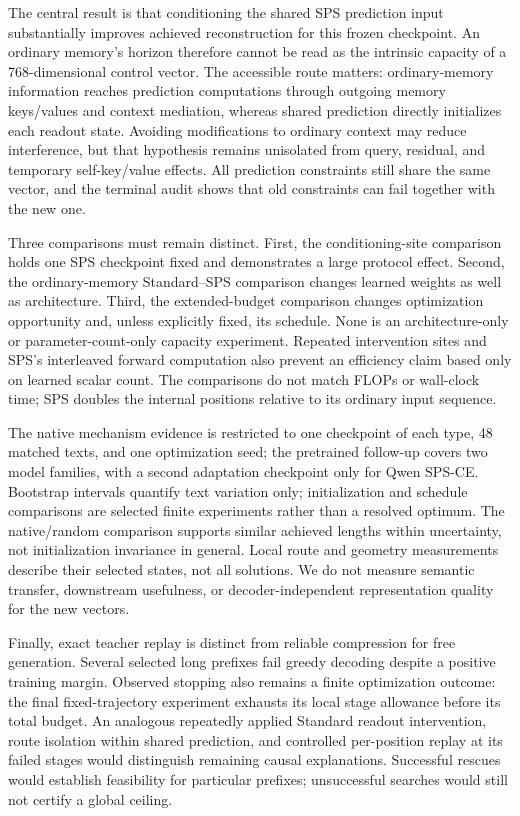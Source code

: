 \documentclass{article}
\begin{document}
The central result is that conditioning the shared SPS prediction input substantially improves achieved reconstruction for this frozen checkpoint.
An ordinary memory's horizon therefore cannot be read as the intrinsic capacity of a 768-dimensional control vector.
The accessible route matters: ordinary-memory information reaches prediction computations through outgoing memory keys/values and context mediation, whereas shared prediction directly initializes each readout state.
Avoiding modifications to ordinary context may reduce interference, but that hypothesis remains unisolated from query, residual, and temporary self-key/value effects.
All prediction constraints still share the same vector, and the terminal audit shows that old constraints can fail together with the new one.

Three comparisons must remain distinct.
First, the conditioning-site comparison holds one SPS checkpoint fixed and demonstrates a large protocol effect.
Second, the ordinary-memory Standard--SPS comparison changes learned weights as well as architecture.
Third, the extended-budget comparison changes optimization opportunity and, unless explicitly fixed, its schedule.
None is an architecture-only or parameter-count-only capacity experiment.
Repeated intervention sites and SPS's interleaved forward computation also prevent an efficiency claim based only on learned scalar count.
The comparisons do not match FLOPs or wall-clock time; SPS doubles the internal positions relative to its ordinary input sequence.

The native mechanism evidence is restricted to one checkpoint of each type, 48 matched texts, and one optimization seed; the pretrained follow-up covers two model families, with a second adaptation checkpoint only for Qwen SPS-CE.
Bootstrap intervals quantify text variation only; initialization and schedule comparisons are selected finite experiments rather than a resolved optimum.
The native/random comparison supports similar achieved lengths within uncertainty, not initialization invariance in general.
Local route and geometry measurements describe their selected states, not all solutions.
We do not measure semantic transfer, downstream usefulness, or decoder-independent representation quality for the new vectors.

Finally, exact teacher replay is distinct from reliable compression for free generation.
Several selected long prefixes fail greedy decoding despite a positive training margin.
Observed stopping also remains a finite optimization outcome: the final fixed-trajectory experiment exhausts its local stage allowance before its total budget.
An analogous repeatedly applied Standard readout intervention, route isolation within shared prediction, and controlled per-position replay at its failed stages would distinguish remaining causal explanations.
Successful rescues would establish feasibility for particular prefixes; unsuccessful searches would still not certify a global ceiling.
\end{document}

